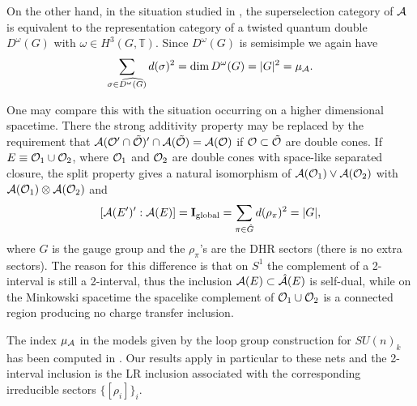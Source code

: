 \documentclass[12pt]{article}
\def\dim{{\hbox{dim}}}
\def\A{{\cal A}}
\def\O{{\cal O}}
\def\In{{\bf{I}}}
\begin{document}
On the other hand, in the situation studied in \cite{Mu4},
the superselection category of $\A$ is equivalent to the
representation category of a twisted quantum double $D^\omega(G)$
with $\omega\in H^3(G,{\mathbb T})$. Since $D^\omega(G)$ is semisimple
we again have
\[
\sum_{\sigma\in\widehat{D^\omega(G)}}d(\sigma)^2=\dim\,D^\omega(G)=|G|^2=\mu
_\A.
\]
\smallskip

One may compare this with the situation occurring
on a higher dimensional spacetime.
There the strong additivity property may be replaced by the
requirement that $\A(\O'\cap\tilde\O)'\cap\A(\tilde \O)=\A(\O)$ if
$\O\subset\tilde\O$ are double cones. If $E\equiv \O_1\cup\O_2$, where
$\O_1$ and $\O_2$ are double cones with space-like separated closure,
the split property gives a natural isomorphism of $\A(\O_1)\vee\A(\O_2)$
with $\A(\O_1)\otimes\A(\O_2)$ and
\[
[\A(E')':\A(E)]=\In_{\rm global}=\sum_{\pi\in\hat
G}d(\rho_{\pi})^2 = |G|,
\]
where $G$ is the gauge group and the $\rho_{\pi}$'s are the DHR sectors
\cite{DHR} (there is no extra sectors). The reason for this difference
is that on $S^1$ the complement of a 2-interval is still a
2-interval, thus the inclusion $\A(E)\subset\hat\A(E)$ is self-dual,
while on the Minkowski spacetime the spacelike complement of
$\O_1\cup\O_2$
is a connected region producing no charge transfer inclusion.
\smallskip

The index $\mu_\A$ in the models given by
the loop group construction for $SU(n)_k$ has been computed in
\cite{X2}.
Our results apply in particular to these nets and the 2-interval
inclusion is  the LR inclusion associated with the corresponding
irreducible sectors
$\{[\rho_i]\}_i$.
\end{document}
